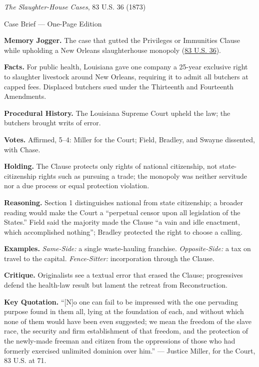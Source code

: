 \documentclass[12pt]{article}
\begin{document}
\begin{center}
{\Large \textit{The Slaughter-House Cases}, 83 U.S. 36 (1873)\par}
\vspace{0.3em}
{\normalsize Case Brief --- One-Page Edition\par}
\end{center}

\textbf{Memory Jogger.} The case that gutted the Privileges or Immunities Clause while upholding a New Orleans slaughterhouse monopoly (\href{https://www.courtlistener.com/opinion/88661/butchers-benevolent-assn-v-crescent-city-live-stock-landing/}{83 U.S. 36}).

\textbf{Facts.} For public health, Louisiana gave one company a 25-year exclusive right to slaughter livestock around New Orleans, requiring it to admit all butchers at capped fees. Displaced butchers sued under the Thirteenth and Fourteenth Amendments.

\textbf{Procedural History.} The Louisiana Supreme Court upheld the law; the butchers brought writs of error.

\textbf{Votes.} Affirmed, 5--4: Miller for the Court; Field, Bradley, and Swayne dissented, with Chase.

\textbf{Holding.} The Clause protects only rights of national citizenship, not state-citizenship rights such as pursuing a trade; the monopoly was neither servitude nor a due process or equal protection violation.

\textbf{Reasoning.} Section 1 distinguishes national from state citizenship; a broader reading would make the Court a ``perpetual censor upon all legislation of the States.'' Field said the majority made the Clause ``a vain and idle enactment, which accomplished nothing''; Bradley protected the right to choose a calling.

\textbf{Examples.} \emph{Same-Side:} a single waste-hauling franchise. \emph{Opposite-Side:} a tax on travel to the capital. \emph{Fence-Sitter:} incorporation through the Clause.

\textbf{Critique.} Originalists see a textual error that erased the Clause; progressives defend the health-law result but lament the retreat from Reconstruction.

\textbf{Key Quotation.} ``[N]o one can fail to be impressed with the one pervading purpose found in them all, lying at the foundation of each, and without which none of them would have been even suggested; we mean the freedom of the slave race, the security and firm establishment of that freedom, and the protection of the newly-made freeman and citizen from the oppressions of those who had formerly exercised unlimited dominion over him.'' --- Justice Miller, for the Court, 83 U.S. at 71.
\end{document}
